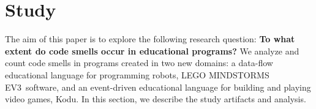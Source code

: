 \documentclass[conference]{IEEEtran}
\newcommand{\ms}{LEGO MINDSTORMS EV3}
\newcommand{\mbs}{\textsc{my blocks}}
\newcommand{\mb}{\textsc{my block}}
\begin{document}
%

\section{Study}
\label{sec:study}
The aim of this paper is to explore the following research question: \textbf{To what extent do code smells occur in educational programs?} 
We analyze and count code smells in programs created in two new domains: a data-flow educational language for programming robots, \ms~software,  and an event-driven educational language for building and playing video games, Kodu. 
In this section, we describe the study artifacts and analysis. 
\end{document}
